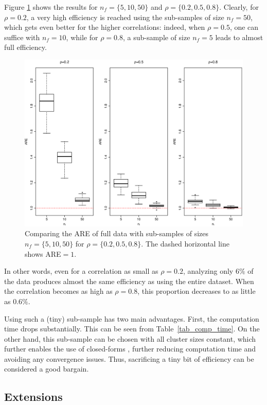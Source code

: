 \documentclass[11pt,a5paper,twoside]{book}
\begin{document}
Figure \ref{fig_m1} shows the results for $n_f=\{5,10,50\}$ and $\rho=\{0.2,0.5,0.8\}$. 
Clearly, for $\rho=0.2$, a very high efficiency is reached using the sub-samples of size $n_f=50$, which gets even better for the higher correlations: indeed, when $\rho=0.5$, one can suffice with $n_f=10$, while for $\rho=0.8$, a sub-sample of size $n_f=5$ leads to almost full efficiency.
\begin{figure}[!t]
\centering
\includegraphics[width=\textwidth]{fig_m1.eps}
\caption{Comparing the ARE of full data with sub-samples of sizes $n_f=\{5,10,50\}$ for $\rho=\{0.2,0.5,0.8\}$. The dashed horizontal line shows ARE$=1$.} 
\label{fig_m1}
\end{figure}  
In other words,  even for a correlation as small as $\rho=0.2$, analyzing only $6\%$ of the data produces almost the same efficiency as using the entire dataset. When the correlation becomes as high as $\rho=0.8$, this proportion decreases to as little as $0.6\%$. 

Using such a (tiny) sub-sample has two main advantages. First, the computation time drops substantially. This can be seen from Table~\ref{tab_comp_time}. On the other hand, this  sub-sample can be chosen with all cluster sizes constant, which further enables the use of closed-forms \cite{Lisa2016_1}, further reducing computation time and avoiding any convergence issues. Thus, sacrificing a tiny bit of efficiency can be considered a good bargain. 

\subsection{Extensions}
\label{sec_detect}
\end{document}
